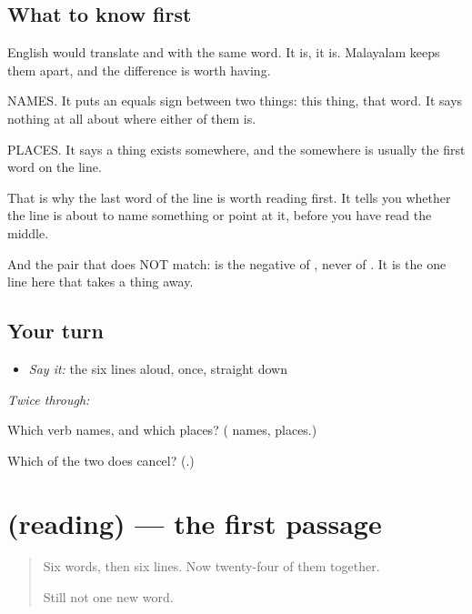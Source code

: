 \subsection*{What to know first}
English would translate \textbf{} and \textbf{} with the same word. It is, it is. Malayalam keeps them apart, and the difference is worth having.

\textbf{} NAMES. It puts an equals sign between two things: this thing, that word. It says nothing at all about where either of them is.

\textbf{} PLACES. It says a thing exists somewhere, and the somewhere is usually the first word on the line.

That is why the last word of the line is worth reading first. It tells you whether the line is about to name something or point at it, before you have read the middle.

And the pair that does NOT match: \textbf{} is the negative of \textbf{}, never of \textbf{}. It is the one line here that takes a thing away.

\subsection*{Your turn}
\begin{itemize}
\raggedright
  \item \emph{Say it:} the six lines aloud, once, straight down
\end{itemize}

\emph{Twice through:}

\begin{tcolorbox}[breakable,colback=teal!4,colframe=teal!35!black,title={Before you move on}]
Which verb names, and which places? (\textbf{} names, \textbf{} places.)

Which of the two does \textbf{} cancel? (\textbf{}.)
\end{tcolorbox}
\section[(reading)]{(reading) — the first passage}

\label{lesson:ML-C69-adyathe-vaayana}



\begin{quote}
Six words, then six lines. Now twenty-four of them together.

Still not one new word.
\end{quote}

